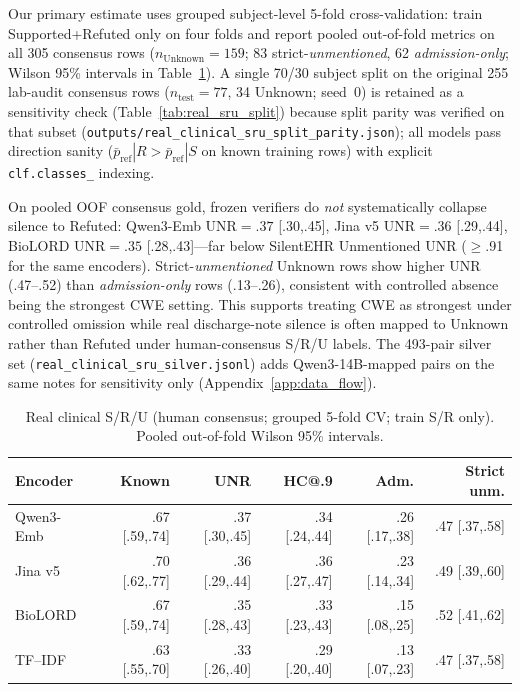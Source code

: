 \documentclass[11pt]{article}
\begin{document}
Our primary estimate uses grouped subject-level 5-fold cross-validation: train
Supported+Refuted only on four folds and report pooled out-of-fold metrics on
all 305 consensus rows ($n_{\mathrm{Unknown}}=159$; 83 strict-\emph{unmentioned},
62 \emph{admission-only}; Wilson 95\% intervals in
Table~\ref{tab:real_sru_cv}). A single 70/30 subject split on the original
255 lab-audit consensus rows ($n_{\mathrm{test}}=77$, 34 Unknown; seed~0) is
retained as a sensitivity check (Table~\ref{tab:real_sru_split}) because split
parity was verified on that subset
(\texttt{outputs/real\_clinical\_sru\_split\_parity.json}); all models pass
direction sanity ($\bar{p}_{\mathrm{ref}}|R > \bar{p}_{\mathrm{ref}}|S$ on
known training rows) with explicit \texttt{clf.classes\_} indexing.

On pooled OOF consensus gold, frozen verifiers do \emph{not} systematically
collapse silence to Refuted: Qwen3-Emb UNR$=.37$ [.30,.45], Jina v5
UNR$=.36$ [.29,.44], BioLORD UNR$=.35$ [.28,.43]---far below SilentEHR
Unmentioned UNR ($\geq$.91 for the same encoders). Strict-\emph{unmentioned}
Unknown rows show higher UNR (.47--.52) than \emph{admission-only} rows
(.13--.26), consistent with controlled absence being the strongest CWE setting.
This supports treating CWE as strongest under controlled omission while real
discharge-note silence is often mapped to Unknown rather than Refuted under
human-consensus S/R/U labels. The 493-pair silver set
(\texttt{real\_clinical\_sru\_silver.jsonl}) adds Qwen3-14B-mapped pairs on the
same notes for sensitivity only (Appendix~\ref{app:data_flow}).

\begin{table}[!htbp]
  \centering
  \scriptsize
  \renewcommand{\arraystretch}{1.06}
  \caption{Real clinical S/R/U (human consensus; grouped 5-fold CV; train S/R
  only). Pooled out-of-fold Wilson 95\% intervals.}
  \label{tab:real_sru_cv}
  \begin{tabular*}{\columnwidth}{@{\extracolsep{\fill}}lrrrrr@{}}
    \toprule
    \textbf{Encoder} & \textbf{Known} & \textbf{UNR} &
    \textbf{HC@.9} & \textbf{Adm.} & \textbf{Strict unm.} \\
    \midrule
    Qwen3-Emb    & .67 [.59,.74] & .37 [.30,.45] &
    .34 [.24,.44] & .26 [.17,.38] & .47 [.37,.58] \\
    Jina v5      & .70 [.62,.77] & .36 [.29,.44] &
    .36 [.27,.47] & .23 [.14,.34] & .49 [.39,.60] \\
    BioLORD      & .67 [.59,.74] & .35 [.28,.43] &
    .33 [.23,.43] & .15 [.08,.25] & .52 [.41,.62] \\
    TF--IDF      & .63 [.55,.70] & .33 [.26,.40] &
    .29 [.20,.40] & .13 [.07,.23] & .47 [.37,.58] \\
    \bottomrule
  \end{tabular*}
\end{table}
\end{document}
